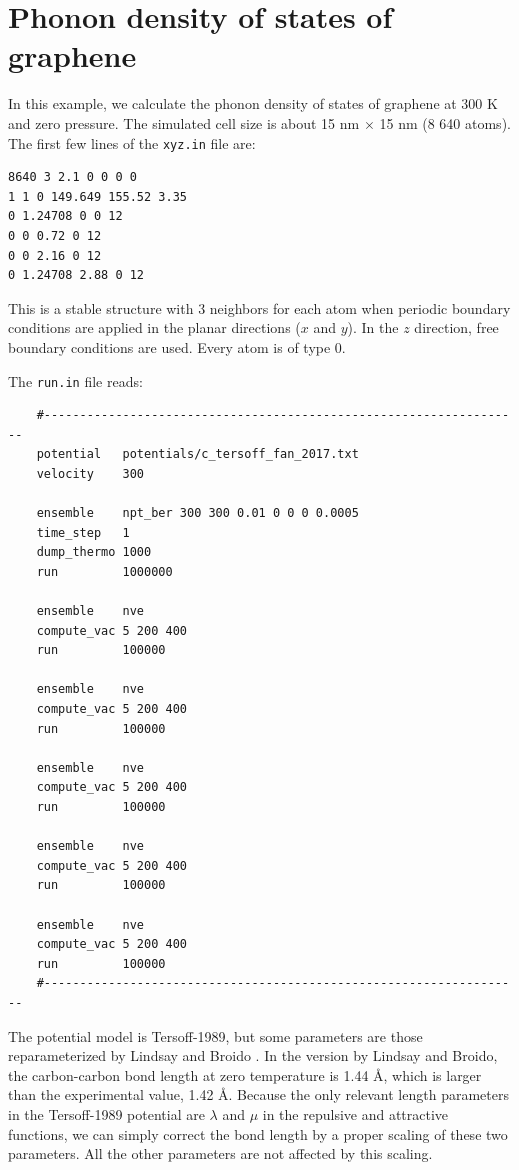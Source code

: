 \documentclass[12pt,a4paper]{report}
\begin{document}
\section{Phonon density of states of graphene}


In this example, we calculate the phonon density of states of graphene at 300 K
and zero pressure. The simulated cell size is about 15 nm $\times$ 15 nm (8 640 atoms).
The first few lines of the \verb"xyz.in" file are:
\begin{verbatim}
8640 3 2.1 0 0 0 0
1 1 0 149.649 155.52 3.35
0 1.24708 0 0 12
0 0 0.72 0 12
0 0 2.16 0 12
0 1.24708 2.88 0 12
\end{verbatim}
This is a stable structure with 3 neighbors for each atom when periodic boundary conditions are applied in the planar directions ($x$ and $y$). In the $z$ direction, free boundary conditions are used. Every atom is of type 0.

The \verb"run.in" file reads:
\begin{verbatim}
    #-------------------------------------------------------------------
    potential   potentials/c_tersoff_fan_2017.txt
    velocity    300

    ensemble    npt_ber 300 300 0.01 0 0 0 0.0005
    time_step   1
    dump_thermo 1000
    run         1000000

    ensemble    nve
    compute_vac 5 200 400
    run         100000

    ensemble    nve
    compute_vac 5 200 400
    run         100000

    ensemble    nve
    compute_vac 5 200 400
    run         100000

    ensemble    nve
    compute_vac 5 200 400
    run         100000

    ensemble    nve
    compute_vac 5 200 400
    run         100000
    #-------------------------------------------------------------------
\end{verbatim}

The potential model is Tersoff-1989, but some parameters are those reparameterized by Lindsay and Broido \cite{lindsay2010prb}. In the version by Lindsay and Broido, the carbon-carbon bond length at zero temperature is 1.44 \AA, which is larger than the experimental value, 1.42 \AA. Because the only relevant length parameters in the Tersoff-1989 potential are $\lambda$ and $\mu$ in the repulsive and attractive functions, we can simply correct the bond length by a proper scaling of these two parameters. All the other parameters are not affected by this scaling.
\end{document}
